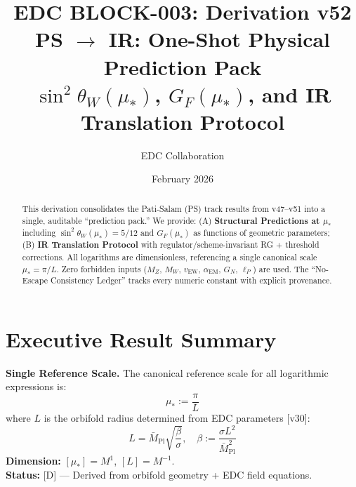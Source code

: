 \documentclass[11pt,a4paper]{article}
\title{\textbf{EDC BLOCK-003: Derivation v52}\\[0.5em]
\Large PS $\to$ IR: One-Shot Physical Prediction Pack\\[0.3em]
\large $\sin^2\theta_W(\mu_*)$, $G_F(\mu_*)$, and IR Translation Protocol}
\author{EDC Collaboration}
\date{February 2026}
\theoremstyle{definition}
\begin{document}
\maketitle

\begin{abstract}
This derivation consolidates the Pati-Salam (PS) track results from v47--v51 into a single,
auditable ``prediction pack.'' We provide: (A) \textbf{Structural Predictions at $\mu_*$}
including $\sin^2\theta_W(\mu_*) = 5/12$ and $G_F(\mu_*)$ as functions of geometric parameters;
(B) \textbf{IR Translation Protocol} with regulator/scheme-invariant RG + threshold corrections.
All logarithms are dimensionless, referencing a single canonical scale $\mu_* = \pi/L$.
Zero forbidden inputs ($M_Z$, $M_W$, $v_{\text{EW}}$, $\alpha_{\text{EM}}$, $G_N$, $\ell_P$) are used.
The ``No-Escape Consistency Ledger'' tracks every numeric constant with explicit provenance.
\end{abstract}


\section*{Executive Result Summary}
\label{sec:executive}

\begin{resultbox}
\textbf{Single Reference Scale.} The canonical reference scale for all logarithmic
expressions is:
\begin{equation}
\label{eq:R1_mu_star}
\boxed{\mu_* := \frac{\pi}{L}}
\end{equation}
where $L$ is the orbifold radius determined from EDC parameters [v30]:
\begin{equation}
\label{eq:R1_L_def}
L = \bar{M}_{\text{Pl}} \sqrt{\frac{\beta}{\sigma}}, \quad \beta := \frac{\sigma L^2}{\bar{M}_{\text{Pl}}^2}
\end{equation}
\textbf{Dimension:} $[\mu_*] = M^1$, $[L] = M^{-1}$.\\
\textbf{Status:} [D] --- Derived from orbifold geometry + EDC field equations.
\end{resultbox}
\end{document}

